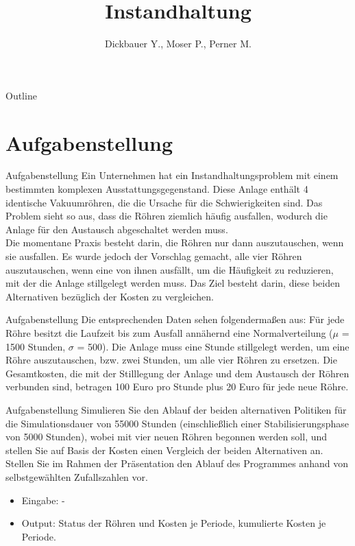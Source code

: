 

\title[BSP20 - Instandhaltung]{Instandhaltung}
\author{Dickbauer Y., Moser P., Perner M.}



\begin{frame}
  \titlepage
\end{frame}

\begin{frame}{Outline}
  \tableofcontents
\end{frame}

\section{Aufgabenstellung}
\begin{frame}{Aufgabenstellung}
Ein Unternehmen hat ein Instandhaltungsproblem mit einem bestimmten komplexen Ausstattungsgegenstand.
Diese Anlage enthält 4 identische Vakuumröhren, die die Ursache
für die Schwierigkeiten sind. Das Problem sieht so aus, dass die Röhren ziemlich häufig
ausfallen, wodurch die Anlage für den Austausch abgeschaltet werden muss.\\

Die momentane Praxis besteht darin, die Röhren nur dann auszutauschen, wenn sie ausfallen.
Es wurde jedoch der Vorschlag gemacht, alle vier Röhren auszutauschen, wenn
eine von ihnen ausfällt, um die Häufigkeit zu reduzieren, mit der die Anlage stillgelegt
werden muss. Das Ziel besteht darin, diese beiden Alternativen bezüglich der Kosten zu
vergleichen.
\end{frame}

\begin{frame}{Aufgabenstellung}
Die entsprechenden Daten sehen folgendermaßen aus: Für jede Röhre besitzt die Laufzeit
bis zum Ausfall annähernd eine Normalverteilung ($\mu$ = 1500 Stunden, $\sigma$ = 500). Die
Anlage muss eine Stunde stillgelegt werden, um eine Röhre auszutauschen, bzw. zwei
Stunden, um alle vier Röhren zu ersetzen. Die Gesamtkosten, die mit der Stilllegung der
Anlage und dem Austausch der Röhren verbunden sind, betragen 100 Euro pro Stunde
plus 20 Euro für jede neue Röhre.
\end{frame}

\begin{frame}{Aufgabenstellung}
Simulieren Sie den Ablauf der beiden alternativen Politiken für die Simulationsdauer
von 55000 Stunden (einschließlich einer Stabilisierungsphase von 5000 Stunden), wobei
mit vier neuen Röhren begonnen werden soll, und stellen Sie auf Basis der Kosten einen
Vergleich der beiden Alternativen an. Stellen Sie im Rahmen der Präsentation den Ablauf
des Programmes anhand von selbstgewählten Zufallszahlen vor.
\begin{itemize}
  \item Eingabe: -
  \item Output: Status der Röhren und Kosten je Periode, kumulierte Kosten je Periode.
\end{itemize}
\end{frame}

